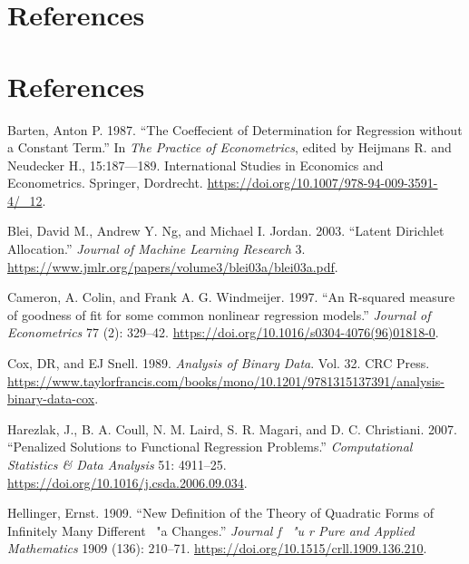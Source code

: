 \hypertarget{references}{%
\section{References}\label{references}}

\hypertarget{references-1}{%
\section*{References}\label{references-1}}

\hypertarget{refs}{}
\begin{CSLReferences}{1}{0}
\leavevmode{}%
Barten, Anton P. 1987. {``{The Coeffecient of Determination for Regression without a Constant Term}.''} In \emph{The Practice of Econometrics}, edited by Heijmans R. and Neudecker H., 15:187---189. International Studies in Economics and Econometrics. Springer, Dordrecht. \url{https://doi.org/10.1007/978-94-009-3591-4/_12}.

\leavevmode{}%
Blei, David M., Andrew Y. Ng, and Michael I. Jordan. 2003. {``{Latent Dirichlet Allocation}.''} \emph{Journal of Machine Learning Research} 3. \url{https://www.jmlr.org/papers/volume3/blei03a/blei03a.pdf}.

\leavevmode{}%
Cameron, A. Colin, and Frank A. G. Windmeijer. 1997. {``{An R-squared measure of goodness of fit for some common nonlinear regression models}.''} \emph{Journal of Econometrics} 77 (2): 329--42. \url{https://doi.org/10.1016/s0304-4076(96)01818-0}.

\leavevmode{}%
Cox, DR, and EJ Snell. 1989. \emph{Analysis of Binary Data}. Vol. 32. CRC Press. \url{https://www.taylorfrancis.com/books/mono/10.1201/9781315137391/analysis-binary-data-cox}.

\leavevmode{}%
Harezlak, J., B. A. Coull, N. M. Laird, S. R. Magari, and D. C. Christiani. 2007. {``Penalized Solutions to Functional Regression Problems.''} \emph{Computational Statistics \& Data Analysis} 51: 4911--25. \url{https://doi.org/10.1016/j.csda.2006.09.034}.

\leavevmode{}%
Hellinger, Ernst. 1909. {``New Definition of the Theory of Quadratic Forms of Infinitely Many Different {~"a} Changes.''} \emph{Journal f {~"u} r Pure and Applied Mathematics} 1909 (136): 210--71. \url{https://doi.org/10.1515/crll.1909.136.210}.


\end{CSLReferences}
